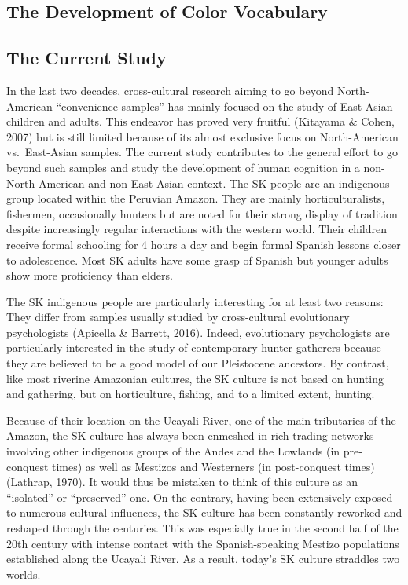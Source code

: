 \documentclass[
  english,
  ,man,floatsintext]{apa6}
\begin{document}
\hypertarget{the-development-of-color-vocabulary}{%
\subsection{The Development of Color Vocabulary}\label{the-development-of-color-vocabulary}}

\hypertarget{the-current-study}{%
\subsection{The Current Study}\label{the-current-study}}

In the last two decades, cross-cultural research aiming to go beyond North-American \enquote{convenience samples} has mainly focused on the study of East Asian children and adults. This endeavor has proved very fruitful (Kitayama \& Cohen, 2007) but is still limited because of its almost exclusive focus on North-American vs.~East-Asian samples. The current study contributes to the general effort to go beyond such samples and study the development of human cognition in a non-North American and non-East Asian context.
The SK people are an indigenous group located within the Peruvian Amazon. They are mainly horticulturalists, fishermen, occasionally hunters but are noted for their strong display of tradition despite increasingly regular interactions with the western world. Their children receive formal schooling for 4 hours a day and begin formal Spanish lessons closer to adolescence. Most SK adults have some grasp of Spanish but younger adults show more proficiency than elders.

The SK indigenous people are particularly interesting for at least two reasons:
They differ from samples usually studied by cross-cultural evolutionary psychologists (Apicella \& Barrett, 2016). Indeed, evolutionary psychologists are particularly interested in the study of contemporary hunter-gatherers because they are believed to be a good model of our Pleistocene ancestors. By contrast, like most riverine Amazonian cultures, the SK culture is not based on hunting and gathering, but on horticulture, fishing, and to a limited extent, hunting.

Because of their location on the Ucayali River, one of the main tributaries of the Amazon, the SK culture has always been enmeshed in rich trading networks involving other indigenous groups of the Andes and the Lowlands (in pre-conquest times) as well as Mestizos and Westerners (in post-conquest times) (Lathrap, 1970). It would thus be mistaken to think of this culture as an \enquote{isolated} or \enquote{preserved} one. On the contrary, having been extensively exposed to numerous cultural influences, the SK culture has been constantly reworked and reshaped through the centuries. This was especially true in the second half of the 20th century with intense contact with the Spanish-speaking Mestizo populations established along the Ucayali River. As a result, today's SK culture straddles two worlds.
\end{document}
